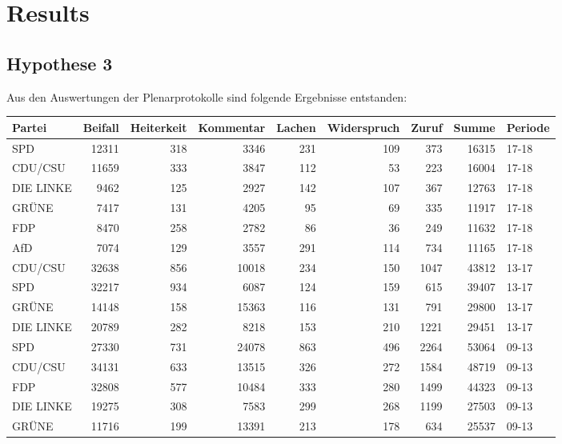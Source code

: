 \section{Results}
\subsection{Hypothese 3}

Aus den Auswertungen der Plenarprotokolle sind folgende Ergebnisse entstanden:
\begin{center}
\begin{table}[ht]
	\centering
	\begin{tabular}{lrrrrrrrl}
		\hline
		Partei & Beifall & Heiterkeit & Kommentar & Lachen & Widerspruch & Zuruf & Summe & Periode \\ 
		\hline
		\hline
		SPD & 12311 & 318 & 3346 & 231 & 109 & 373 & 16315 & 17-18 \\ 
		CDU/CSU & 11659 & 333 & 3847 & 112 &  53 & 223 & 16004 & 17-18 \\ 
		DIE LINKE & 9462 & 125 & 2927 & 142 & 107 & 367 & 12763 & 17-18 \\ 
		GRÜNE & 7417 & 131 & 4205 &  95 &  69 & 335 & 11917 & 17-18 \\ 
		FDP & 8470 & 258 & 2782 &  86 &  36 & 249 & 11632 & 17-18 \\ 
		AfD & 7074 & 129 & 3557 & 291 & 114 & 734 & 11165 & 17-18 \\ 
		\hline
		CDU/CSU & 32638 & 856 & 10018 & 234 & 150 & 1047 & 43812 & 13-17 \\ 
		SPD & 32217 & 934 & 6087 & 124 & 159 & 615 & 39407 & 13-17 \\ 
		GRÜNE & 14148 & 158 & 15363 & 116 & 131 & 791 & 29800 & 13-17 \\ 
		DIE LINKE & 20789 & 282 & 8218 & 153 & 210 & 1221 & 29451 & 13-17 \\ 
		\hline
		SPD & 27330 & 731 & 24078 & 863 & 496 & 2264 & 53064 & 09-13 \\ 
		CDU/CSU & 34131 & 633 & 13515 & 326 & 272 & 1584 & 48719 & 09-13 \\ 
		FDP & 32808 & 577 & 10484 & 333 & 280 & 1499 & 44323 & 09-13 \\ 
		DIE LINKE & 19275 & 308 & 7583 & 299 & 268 & 1199 & 27503 & 09-13 \\ 
		GRÜNE & 11716 & 199 & 13391 & 213 & 178 & 634 & 25537 & 09-13 \\ 
		\hline
	\end{tabular}
\end{table}
\end{center}

